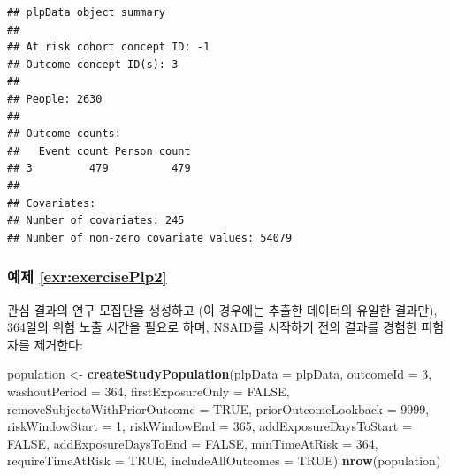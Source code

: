 \documentclass[11pt]{book}
\newenvironment{Shaded}{\begin{snugshade}}{\end{snugshade}}
\newcommand{\KeywordTok}[1]{\textcolor[rgb]{0.13,0.29,0.53}{\textbf{#1}}}
\newcommand{\DataTypeTok}[1]{\textcolor[rgb]{0.13,0.29,0.53}{#1}}
\newcommand{\DecValTok}[1]{\textcolor[rgb]{0.00,0.00,0.81}{#1}}
\newcommand{\StringTok}[1]{\textcolor[rgb]{0.31,0.60,0.02}{#1}}
\newcommand{\OtherTok}[1]{\textcolor[rgb]{0.56,0.35,0.01}{#1}}
\newcommand{\NormalTok}[1]{#1}
\theoremstyle{definition}
\theoremstyle{definition}
\theoremstyle{definition}
\theoremstyle{remark}
\begin{document}
\begin{verbatim}
## plpData object summary
## 
## At risk cohort concept ID: -1
## Outcome concept ID(s): 3
## 
## People: 2630
## 
## Outcome counts:
##   Event count Person count
## 3         479          479
## 
## Covariates:
## Number of covariates: 245
## Number of non-zero covariate values: 54079
\end{verbatim}

\subsubsection*{예제 \ref{exr:exercisePlp2}}\label{-refexrexerciseplp2}

관심 결과의 연구 모집단을 생성하고 (이 경우에는 추출한 데이터의 유일한
결과만), 364일의 위험 노출 시간을 필요로 하며, NSAID를 시작하기 전의
결과를 경험한 피험자를 제거한다:

\begin{Shaded}
\begin{Highlighting}[]
\NormalTok{population <-}\StringTok{ }\KeywordTok{createStudyPopulation}\NormalTok{(}\DataTypeTok{plpData =}\NormalTok{ plpData,}
                                    \DataTypeTok{outcomeId =} \DecValTok{3}\NormalTok{,}
                                    \DataTypeTok{washoutPeriod =} \DecValTok{364}\NormalTok{,}
                                    \DataTypeTok{firstExposureOnly =} \OtherTok{FALSE}\NormalTok{,}
                                    \DataTypeTok{removeSubjectsWithPriorOutcome =} \OtherTok{TRUE}\NormalTok{,}
                                    \DataTypeTok{priorOutcomeLookback =} \DecValTok{9999}\NormalTok{,}
                                    \DataTypeTok{riskWindowStart =} \DecValTok{1}\NormalTok{,}
                                    \DataTypeTok{riskWindowEnd =} \DecValTok{365}\NormalTok{,}
                                    \DataTypeTok{addExposureDaysToStart =} \OtherTok{FALSE}\NormalTok{,}
                                    \DataTypeTok{addExposureDaysToEnd =} \OtherTok{FALSE}\NormalTok{,}
                                    \DataTypeTok{minTimeAtRisk =} \DecValTok{364}\NormalTok{,}
                                    \DataTypeTok{requireTimeAtRisk =} \OtherTok{TRUE}\NormalTok{,}
                                    \DataTypeTok{includeAllOutcomes =} \OtherTok{TRUE}\NormalTok{)}
\KeywordTok{nrow}\NormalTok{(population)}
\end{Highlighting}
\end{Shaded}
\end{document}

